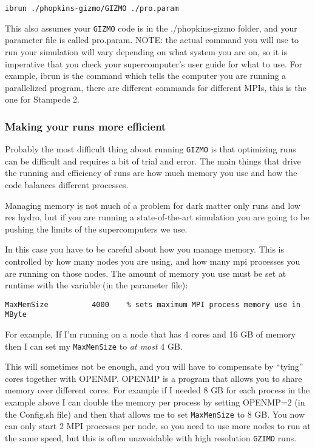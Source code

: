 \documentclass[10pt,a4paper,onecolumn]{article}
\begin{document}
\begin{verbatim}
ibrun ./phopkins-gizmo/GIZMO ./pro.param
\end{verbatim}

This also assumes your \texttt{GIZMO} code is in the ./phopkins-gizmo folder, and your parameter file is called pro.param. NOTE: the actual command you will use to run your simulation will vary depending on what system you are on, so it is imperative that you check your supercomputer's user guide for what to use. For example, ibrun is the command which tells the computer you are running a parallelized program, there are different commands for different MPIs, this is the one for Stampede 2.

\subsubsection{Making your runs more efficient}

Probably the most difficult thing about running \texttt{GIZMO} is that optimizing runs can be difficult and requires a bit of trial and error. The main things that drive the running and efficiency of runs are how much memory you use and how the code balances different processes.

Managing memory is not much of a problem for dark matter only runs and low res hydro, but if you are running a state-of-the-art simulation you are going to be pushing the limits of the supercomputers we use.

In this case you have to be careful about how you manage memory. This is controlled by how many nodes you are using, and how many mpi processes you are running on those nodes. The amount of memory you use must be set at runtime with the variable (in the parameter file):

\begin{verbatim}
MaxMemSize          4000    % sets maximum MPI process memory use in MByte
\end{verbatim}

For example, If I'm running on a node that has 4 cores and 16 GB of memory then I can set my \texttt{MaxMenSize} to \emph{at most} 4 GB.

This will sometimes not be enough, and you will have to compensate by ``tying'' cores together with OPENMP. OPENMP is a program that allows you to share memory over different cores. For example if I needed 8 GB for each process in the example above I can double the memory per process by setting OPENMP=2 (in the Config.sh file) and then that allows me to set  \texttt{MaxMenSize} to 8 GB. You now can only start 2 MPI processes per node, so you need to use more nodes to run at the same speed, but this is often unavoidable with high resolution \texttt{GZIMO} runs.
\end{document}
